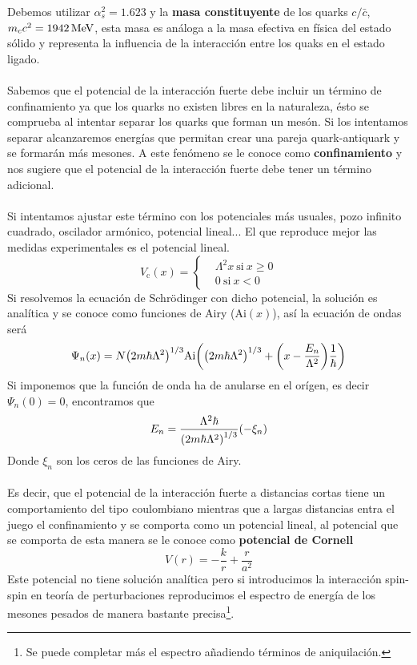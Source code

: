 Debemos utilizar  $\alpha_s^2=1.623$ y la \textbf{masa constituyente} de los quarks $c/\bar{c}$, $m_cc^2=\unit[1942]{MeV}$, esta masa es análoga a la masa efectiva en física del estado sólido y representa la influencia de la interacción entre los quaks en el estado ligado.\\\\
Sabemos que el potencial de la interacción fuerte debe incluir un término de confinamiento ya que los quarks no existen libres en la naturaleza, ésto se comprueba al intentar separar los quarks que forman un mesón. Si los intentamos separar alcanzaremos energías que permitan crear una pareja quark-antiquark y se formarán más mesones. A este fenómeno se le conoce como \textbf{confinamiento} y nos sugiere que el potencial de la interacción fuerte debe tener un término adicional.
\\\\
Si intentamos ajustar este término con los potenciales más usuales, pozo infinito cuadrado, oscilador armónico, potencial lineal... El que reproduce mejor las medidas experimentales es el potencial lineal.
\begin{equation*}
    V_\mathrm{c}(x)=\left \{  \begin{aligned}
        &\Lambda^2 x \ \text{si} \ x\ge0 \\
        & 0 \ \text{si} \ x<0
    \end{aligned}\right.
\end{equation*}
Si resolvemos la ecuación de Schrödinger con dicho potencial, la solución es analítica y se conoce como funciones de Airy ($\mathrm{Ai}(x)$), así la ecuación de ondas será
\begin{equation*}
    \Psi_n(x)=N\qty(2m\hbar \Lambda^2)^{1/3} \mathrm{Ai}\qty(\qty(2m\hbar \Lambda^2)^{1/3}+\qty(x-\frac{E_n}{\Lambda^2})\frac{1}{\hbar})
\end{equation*}
Si imponemos que la función de onda ha de anularse en el orígen, es decir $\Psi_n(0)=0$, encontramos que $$E_n=\frac{\Lambda^2\hbar}{\qty(2m\hbar \Lambda^2)^{1/3}}(-\xi_n)$$ Donde $\xi_n$ son los ceros de las funciones de Airy.
\\\\
Es decir, que el potencial de la interacción fuerte a distancias cortas tiene un comportamiento del tipo coulombiano mientras que a largas distancias entra el juego el confinamiento y se comporta como un potencial lineal, al potencial que se comporta de esta manera se le conoce como \textbf{potencial de Cornell}
\begin{equation}
    V(r)=-\frac{k}{r}+\frac{r}{a^2}
\end{equation}
Este potencial no tiene solución analítica pero si introducimos la interacción spin-spin en teoría de perturbaciones reproducimos el espectro de energía de los mesones pesados de manera bastante precisa\footnote{Se puede completar más el espectro añadiendo términos de aniquilación.}. 

